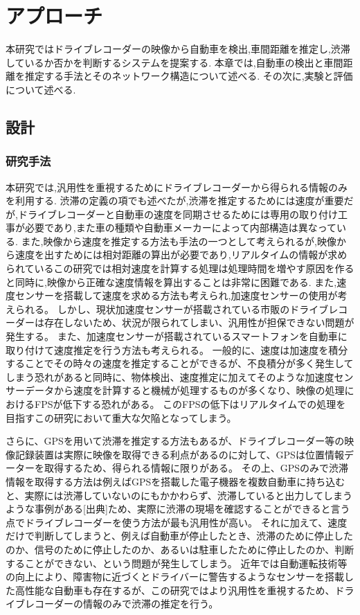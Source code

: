 \chapter{アプローチ}
本研究ではドライブレコーダーの映像から自動車を検出,車間距離を推定し,渋滞しているか否かを判断するシステムを提案する.
本章では,自動車の検出と車間距離を推定する手法とそのネットワーク構造について述べる.
その次に,実験と評価について述べる.

\newpage
\section{設計}
\subsection{研究手法}
本研究では,汎用性を重視するためにドライブレコーダーから得られる情報のみを利用する.
渋滞の定義の項でも述べたが,渋滞を推定するためには速度が重要だが,ドライブレコーダーと自動車の速度を同期させるためには専用の取り付け工事が必要であり,また車の種類や自動車メーカーによって内部構造は異なっている.
また,映像から速度を推定する方法も手法の一つとして考えられるが,映像から速度を出すためには相対距離の算出が必要であり,リアルタイムの情報が求められているこの研究では相対速度を計算する処理は処理時間を増やす原因を作ると同時に,映像から正確な速度情報を算出することは非常に困難である.
また,速度センサーを搭載して速度を求める方法も考えられ,加速度センサーの使用が考えられる。
しかし、現状加速度センサーが搭載されている市販のドライブレコーダーは存在しないため、状況が限られてしまい、汎用性が担保できない問題が発生する。
また、加速度センサーが搭載されているスマートフォンを自動車に取り付けて速度推定を行う方法も考えられる。
一般的に、速度は加速度を積分することでその時々の速度を推定することができるが、不良積分が多く発生してしまう恐れがあると同時に、物体検出、速度推定に加えてそのような加速度センサーデータから速度を計算すると機械が処理するものが多くなり、映像の処理におけるFPSが低下する恐れがある。
このFPSの低下はリアルタイムでの処理を目指すこの研究において重大な欠陥となってしまう。

さらに、GPSを用いて渋滞を推定する方法もあるが、ドライブレコーダー等の映像記録装置は実際に映像を取得できる利点があるのに対して、GPSは位置情報データーを取得するため、得られる情報に限りがある。
その上、GPSのみで渋滞情報を取得する方法は例えばGPSを搭載した電子機器を複数自動車に持ち込むと、実際には渋滞していないのにもかかわらず、渋滞していると出力してしまうような事例がある[出典]ため、実際に渋滞の現場を確認することができると言う点でドライブレコーダーを使う方法が最も汎用性が高い。
それに加えて、速度だけで判断してしまうと、例えば自動車が停止したとき、渋滞のために停止したのか、信号のために停止したのか、あるいは駐車したために停止したのか、判断することができない、という問題が発生してしまう。
近年では自動運転技術等の向上により、障害物に近づくとドライバーに警告するようなセンサーを搭載した高性能な自動車も存在するが、この研究ではより汎用性を重視するため、ドライブレコーダーの情報のみで渋滞の推定を行う。

